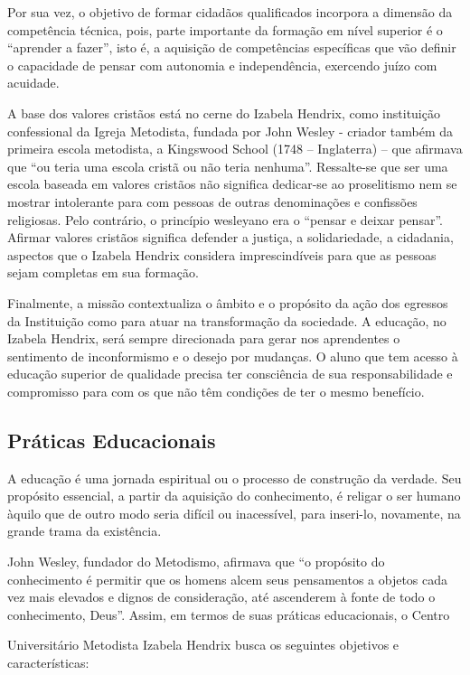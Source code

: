 \documentclass[a4paper, 12pt, openright, oneside, german, french, english, brazil]{abntex2}
\begin{document}
Por sua vez, o objetivo de formar cidadãos qualificados incorpora a dimensão da competência técnica, pois, parte importante da formação em nível superior é o “aprender a fazer”, isto é, a aquisição de competências específicas que vão definir o capacidade de pensar com autonomia e independência, exercendo juízo com acuidade.

A base dos valores cristãos está no cerne do Izabela Hendrix, como instituição confessional da Igreja Metodista, fundada por John Wesley - criador também da primeira escola metodista, a Kingswood School (1748 – Inglaterra) – que afirmava que ``ou teria uma escola cristã ou não teria nenhuma''. Ressalte-se que ser uma escola baseada em valores cristãos não significa dedicar-se ao proselitismo nem se mostrar intolerante para com pessoas de outras denominações e confissões religiosas. Pelo contrário, o princípio wesleyano era o ``pensar e deixar pensar''. Afirmar valores cristãos significa defender a justiça, a solidariedade, a cidadania, aspectos que o Izabela Hendrix considera imprescindíveis para que as pessoas sejam completas em sua formação.

Finalmente, a missão contextualiza o âmbito e o propósito da ação dos egressos da Instituição como para atuar na transformação da sociedade. A educação, no Izabela Hendrix, será sempre direcionada para gerar nos aprendentes o sentimento de inconformismo e o desejo por mudanças. O aluno que tem acesso à educação superior de qualidade precisa ter consciência de sua responsabilidade e compromisso para com os que não têm condições de ter o mesmo benefício.

\subsection{Práticas Educacionais}

A educação é uma jornada espiritual ou o processo de construção da verdade. Seu propósito essencial, a partir da aquisição do conhecimento, é religar o ser humano àquilo que de outro modo seria difícil ou inacessível, para inseri-lo, novamente, na grande trama da existência.

John Wesley, fundador do Metodismo, afirmava que “o propósito do conhecimento é permitir que os homens alcem seus pensamentos a objetos cada vez mais elevados e dignos de consideração, até ascenderem à fonte de todo o conhecimento, Deus”. Assim, em termos de suas práticas educacionais, o Centro

Universitário Metodista Izabela Hendrix busca os seguintes objetivos e características:
\end{document}
